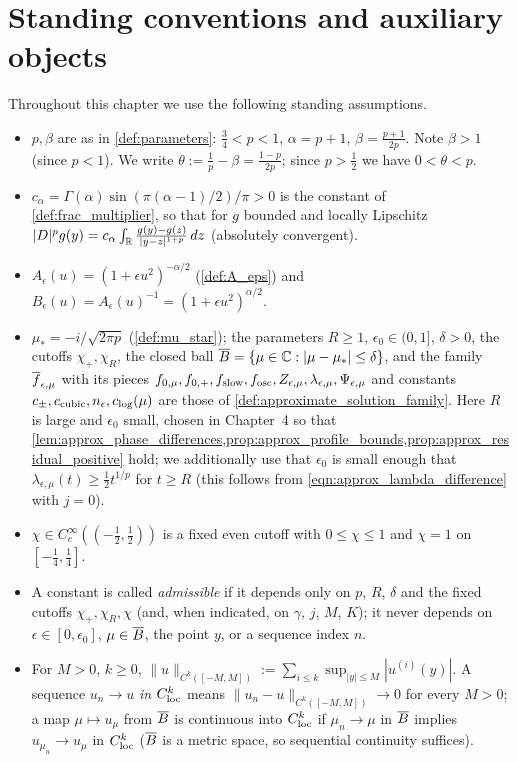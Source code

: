 
\section{Standing conventions and auxiliary objects}

Throughout this chapter we use the following standing assumptions.
\begin{itemize}
  \item $p,\beta$ are as in \cref{def:parameters}: $\tfrac34<p<1$, $\alpha=p+1$,
    $\beta=\tfrac{p+1}{2p}$. Note $\beta>1$ (since $p<1$). We write
    $\theta:=\tfrac1p-\beta=\tfrac{1-p}{2p}$; since $p>\tfrac12$ we have $0<\theta<p$.
  \item $c_\alpha=\Gamma(\alpha)\sin(\pi(\alpha-1)/2)/\pi>0$ is the constant of
    \cref{def:frac_multiplier}, so that for $g$ bounded and locally Lipschitz
    $|D|^pg(y)=c_\alpha\int_{\mathbb{R}}\frac{g(y)-g(z)}{|y-z|^{1+p}}\,dz$ (absolutely convergent).
  \item $A_\epsilon(u)=(1+\epsilon u^2)^{-\alpha/2}$ (\cref{def:A_eps}) and
    $B_\epsilon(u)=A_\epsilon(u)^{-1}=(1+\epsilon u^2)^{\alpha/2}$.
  \item $\mu_*=-i/\sqrt{2\pi p}$ (\cref{def:mu_star}); the parameters $R\geq1$,
    $\epsilon_0\in(0,1]$, $\delta>0$, the cutoffs $\chi_+,\chi_R$, the closed ball
    $\overline{B}=\{\mu\in\mathbb{C}:|\mu-\mu_*|\le\delta\}$, and the family $\overline{f}_{\epsilon,\mu}$
    with its pieces $f_{0,\mu},f_{0,+},f_{\textup{slow}},f_{\textup{osc}},Z_{\epsilon,\mu},\lambda_{\epsilon,\mu},\Psi_{\epsilon,\mu}$
    and constants $c_\pm,c_{\textup{cubic}},n_\epsilon,c_{\textup{log}}(\mu)$ are those of
    \cref{def:approximate_solution_family}. Here $R$ is large and $\epsilon_0$ small, chosen
    in Chapter~4 so that \cref{lem:approx_phase_differences,prop:approx_profile_bounds,prop:approx_residual_positive}
    hold; we additionally use that $\epsilon_0$ is small enough that
    $\lambda_{\epsilon,\mu}(t)\ge \tfrac12 t^{1/p}$ for $t\ge R$ (this follows from
    \eqref{eqn:approx_lambda_difference} with $j=0$).
  \item $\chi\in C_c^\infty((-\tfrac12,\tfrac12))$ is a fixed even cutoff with $0\le\chi\le1$ and
    $\chi=1$ on $[-\tfrac14,\tfrac14]$.
  \item A constant is called \emph{admissible} if it depends only on $p$, $R$, $\delta$ and the
    fixed cutoffs $\chi_+,\chi_R,\chi$ (and, when indicated, on $\gamma$, $j$, $M$, $K$); it never
    depends on $\epsilon\in[0,\epsilon_0]$, $\mu\in\overline{B}$, the point $y$, or a sequence index $n$.
  \item For $M>0$, $k\geq0$, $\|u\|_{C^k([-M,M])}:=\sum_{i\le k}\sup_{|y|\le M}|u^{(i)}(y)|$.
    A sequence $u_n\to u$ \emph{in $C^k_{\textup{loc}}$} means
    $\|u_n-u\|_{C^k([-M,M])}\to0$ for every $M>0$; a map $\mu\mapsto u_\mu$ from $\overline{B}$ is
    continuous into $C^k_{\textup{loc}}$ if $\mu_n\to\mu$ in $\overline{B}$ implies $u_{\mu_n}\to u_\mu$
    in $C^k_{\textup{loc}}$ ($\overline{B}$ is a metric space, so sequential continuity suffices).
\end{itemize}

